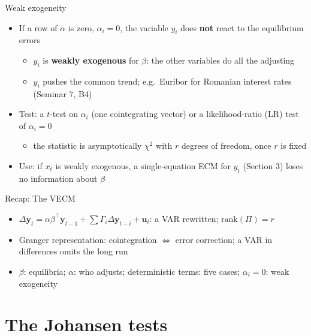 \begin{frame}{Weak exogeneity}
\itemsize{\small}
\begin{itemize}
    \item If a row of $\alpha$ is zero, $\alpha_i = 0$, the variable $y_i$ does \textbf{not} react to the equilibrium errors
    \begin{itemize}
        \item $y_i$ is \textbf{weakly exogenous} for $\beta$: the other variables do all the adjusting
        \item $y_i$ pushes the common trend; e.g.\ Euribor for Romanian interest rates (Seminar 7, B4)
    \end{itemize}
    \item Test: a $t$-test on $\alpha_i$ (one cointegrating vector) or a likelihood-ratio (LR) test of $\alpha_i = 0$ 
    \begin{itemize}
        \item the statistic is asymptotically $\chi^2$ with $r$ degrees of freedom, once $r$ is fixed
    \end{itemize}
    \item Use: if $x_t$ is weakly exogenous, a single-equation ECM for $y_t$ (Section 3) loses no information about $\beta$
\end{itemize}
\end{frame}

\begin{frame}{Recap: The VECM}
\itemsize{\small}
\begin{itemize}
    \item $\Delta\mathbf y_t = \alpha\beta^\top\mathbf y_{t-1} + \sum\Gamma_i\Delta\mathbf y_{t-i} + \mathbf u_t$: a VAR rewritten; $\mathrm{rank}(\Pi) = r$
    \item Granger representation: cointegration $\Leftrightarrow$ error correction; a VAR in differences omits the long run
    \item $\beta$: equilibria; $\alpha$: who adjusts; deterministic terms: five cases; $\alpha_i = 0$: weak exogeneity
\end{itemize}
\end{frame}


\section{The Johansen tests}

